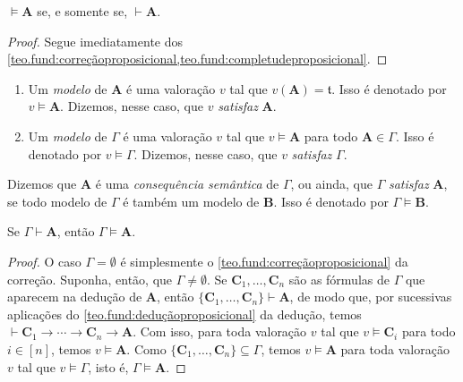 \begin{corollary}[Adequação]
    $\vDash \mathbf{A}$ se, e somente se, $\vdash \mathbf{A}$.
\end{corollary}

\begin{proof}
    Segue imediatamente dos \cref{teo.fund:correçãoproposicional,teo.fund:completudeproposicional}. \blackproof
\end{proof}

\begin{definition}
    \leavevmode
        \begin{enumerate}[leftmargin=*, align=left, label=\textbf{(\alph*)}]
            \item Um \emph{modelo} de $\mathbf{A}$ é uma valoração $v$ tal que $v(\mathbf{A}) = \mathfrak{t}$. Isso é denotado por $v \vDash \mathbf{A}$. Dizemos, nesse caso, que $v$ \emph{satisfaz} $\mathbf{A}$.
            \item Um \emph{modelo} de $\Gamma$ é uma valoração $v$ tal que $v \vDash \mathbf{A}$ para todo $\mathbf{A} \in \Gamma$. Isso é denotado por $v \vDash \Gamma$. Dizemos, nesse caso, que $v$ \emph{satisfaz} $\Gamma$.
        \end{enumerate}
\end{definition}

\begin{definition}
    Dizemos que $\mathbf{A}$ é uma \emph{consequência semântica} de $\Gamma$, ou ainda, que $\Gamma$ \emph{satisfaz} $\mathbf{A}$, se todo modelo de $\Gamma$ é também um modelo de $\mathbf{B}$. Isso é denotado por $\Gamma \vDash \mathbf{B}$.
\end{definition}

\begin{theorem} \label{teo.fund:correçãoproposicionalforte}
    Se $\Gamma \vdash \mathbf{A}$, então $\Gamma \vDash \mathbf{A}$.
\end{theorem}

\begin{proof}
    O caso $\Gamma = \emptyset$ é simplesmente o \cref{teo.fund:correçãoproposicional} da correção. Suponha, então, que $\Gamma \neq \emptyset$. Se $\mathbf{C}_1, \ldots, \mathbf{C}_n$ são as fórmulas de $\Gamma$ que aparecem na dedução de $\mathbf{A}$, então $\{\mathbf{C}_1, \ldots, \mathbf{C}_n\} \vdash \mathbf{A}$, de modo que, por sucessivas aplicações do \cref{teo.fund:deduçãoproposicional} da dedução, temos $\vdash \mathbf{C}_1 \rightarrow \cdots \rightarrow \mathbf{C}_n \rightarrow \mathbf{A}$. Com isso, para toda valoração $v$ tal que $v \vDash \mathbf{C}_i$ para todo $i \in [n]$, temos $v \vDash \mathbf{A}$. Como $\{\mathbf{C}_1, \ldots, \mathbf{C}_n\} \subseteq \Gamma$, temos $v \vDash \mathbf{A}$ para toda valoração $v$ tal que $v \vDash \Gamma$, isto é, $\Gamma \vDash \mathbf{A}$. \blackproof
\end{proof}

